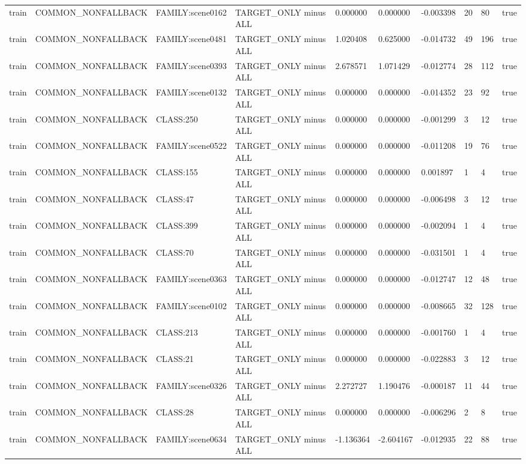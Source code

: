 \begin{tabular}{llllllllll}
train & COMMON\_NONFALLBACK & FAMILY:scene0162 & TARGET\_ONLY minus ALL & 0.000000 & 0.000000 & -0.003398 & 20 & 80 & true \\
train & COMMON\_NONFALLBACK & FAMILY:scene0481 & TARGET\_ONLY minus ALL & 1.020408 & 0.625000 & -0.014732 & 49 & 196 & true \\
train & COMMON\_NONFALLBACK & FAMILY:scene0393 & TARGET\_ONLY minus ALL & 2.678571 & 1.071429 & -0.012774 & 28 & 112 & true \\
train & COMMON\_NONFALLBACK & FAMILY:scene0132 & TARGET\_ONLY minus ALL & 0.000000 & 0.000000 & -0.014352 & 23 & 92 & true \\
train & COMMON\_NONFALLBACK & CLASS:250 & TARGET\_ONLY minus ALL & 0.000000 & 0.000000 & -0.001299 & 3 & 12 & true \\
train & COMMON\_NONFALLBACK & FAMILY:scene0522 & TARGET\_ONLY minus ALL & 0.000000 & 0.000000 & -0.011208 & 19 & 76 & true \\
train & COMMON\_NONFALLBACK & CLASS:155 & TARGET\_ONLY minus ALL & 0.000000 & 0.000000 & 0.001897 & 1 & 4 & true \\
train & COMMON\_NONFALLBACK & CLASS:47 & TARGET\_ONLY minus ALL & 0.000000 & 0.000000 & -0.006498 & 3 & 12 & true \\
train & COMMON\_NONFALLBACK & CLASS:399 & TARGET\_ONLY minus ALL & 0.000000 & 0.000000 & -0.002094 & 1 & 4 & true \\
train & COMMON\_NONFALLBACK & CLASS:70 & TARGET\_ONLY minus ALL & 0.000000 & 0.000000 & -0.031501 & 1 & 4 & true \\
train & COMMON\_NONFALLBACK & FAMILY:scene0363 & TARGET\_ONLY minus ALL & 0.000000 & 0.000000 & -0.012747 & 12 & 48 & true \\
train & COMMON\_NONFALLBACK & FAMILY:scene0102 & TARGET\_ONLY minus ALL & 0.000000 & 0.000000 & -0.008665 & 32 & 128 & true \\
train & COMMON\_NONFALLBACK & CLASS:213 & TARGET\_ONLY minus ALL & 0.000000 & 0.000000 & -0.001760 & 1 & 4 & true \\
train & COMMON\_NONFALLBACK & CLASS:21 & TARGET\_ONLY minus ALL & 0.000000 & 0.000000 & -0.022883 & 3 & 12 & true \\
train & COMMON\_NONFALLBACK & FAMILY:scene0326 & TARGET\_ONLY minus ALL & 2.272727 & 1.190476 & -0.000187 & 11 & 44 & true \\
train & COMMON\_NONFALLBACK & CLASS:28 & TARGET\_ONLY minus ALL & 0.000000 & 0.000000 & -0.006296 & 2 & 8 & true \\
train & COMMON\_NONFALLBACK & FAMILY:scene0634 & TARGET\_ONLY minus ALL & -1.136364 & -2.604167 & -0.012935 & 22 & 88 & true \\

\end{tabular}
